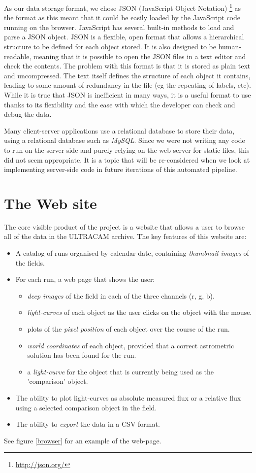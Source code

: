As our data storage format, we chose JSON (JavaScript Object Notation) \footnote{\url{http://json.org/}} as the format as this meant that it could be easily loaded by the JavaScript code running on the browser. JavaScript has several built-in methods to load and parse a JSON object. JSON is a flexible, open format that allows a hierarchical structure to be defined for each object stored. It is also designed to be human-readable, meaning that it is possible to open the JSON files in a text editor and check the contents. The problem with this format is that it is stored as plain text and uncompressed. The text itself defines the structure of each object it contains, leading to some amount of redundancy in the file (eg the repeating of labels, etc). While it is true that JSON is inefficient in many ways, it is a useful format to use thanks to its flexibility and the ease with which the developer can check and debug the data. 

Many client-server applications use a relational database to store their data, using a relational database such as \emph{MySQL}. Since we were not writing any code to run on the server-side and purely relying on the web server for static files, this did not seem appropriate. It is a topic that will be re-considered when we look at implementing server-side code in future iterations of this automated pipeline. 

\section{The Web site}
The core visible product of the project is a website that allows a user to browse all of the data in the ULTRACAM archive. The key features of this website are:

\begin{itemize}
	\item A catalog of runs organised by calendar date, containing \emph{thumbnail images} of the fields.
	\item For each run, a web page that shows the user:
	\begin{itemize}
		\item \emph{deep images} of the field in each of the three channels (r, g, b).
		\item \emph{light-curves} of each object as the user clicks on the object with the mouse. 
		\item plots of the \emph{pixel position} of each object over the course of the run.
		\item \emph{world coordinates} of each object, provided that a correct astrometric solution has been found for the run. 
		\item a \emph{light-curve} for the object that is currently being used as the 'comparison' object. 
	\end{itemize}
	\item The ability to plot light-curves as absolute measured flux or a relative flux using a selected comparison object in the field. 
	\item The ability to \emph{export} the data in a CSV format.
	
\end{itemize}
See figure \ref{browser} for an example of the web-page. 

